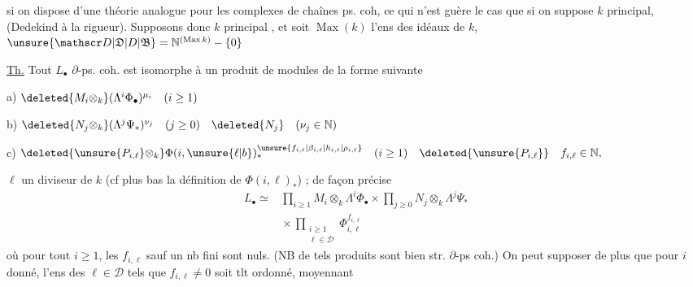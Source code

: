 si on dispose d'une théorie analogue pour les complexes de chaînes  ps. coh, ce qui n'est guère le cas que si on suppose $k$ principal, (Dedekind à la rigueur). Supposons donc $k$  principal  
, et soit $\operatorname{Max}(k)$ l'ens des idéaux   de $k$, $\unsure{\mathscr D|\mathfrak D|D|\mathfrak B}=\mathbb N^{(\operatorname{Max} k)}-\{0\}$

\uline{Th.} Tout $L_\bullet$  $\partial$-ps. coh. est isomorphe à un produit de modules de la forme suivante

a) $\deleted{M_i\otimes_k}(\Lambda^i\Phi_\bullet)^{\mu_i}\quad(i\geq1)$  

b) $\deleted{N_j\otimes_k}(\Lambda^j\Psi_*)^{\nu_j}\quad(j\geq0)\quad\deleted{N_j}\quad(\nu_j\in\mathbb N)$

c) $\deleted{\unsure{P_{i,\ell}}\otimes_k}\Phi(i,\unsure{\ell|b})_*^{\unsure{f_{i,\ell}|\beta_{i,\ell}|h_{i,\ell}|\rho_{i,\ell}}}\quad(i\geq1)\quad\deleted{\unsure{P_{i,\ell}}}\quad f_{i,\ell}\in\mathbb N,$


$\ell$ un  diviseur de $k$ (cf plus bas la définition de $\Phi(i,\ell)_*$) ; de façon précise
\[
\begin{aligned}
L_\bullet\simeq{}&\prod_{i\geq1}M_i\otimes_k\Lambda^i\Phi_\bullet
 \times\prod_{j\geq0}N_j\otimes_k\Lambda^j\Psi_*\\
&{}\times\prod_{\substack{i\geq1\\\ell\in\mathscr D}}\Phi_{i,\ell}^{f_{i,\ell}}
\end{aligned}
\]
où pour tout $i\geq1$,  les $f_{i,\ell}$ sauf un nb fini sont nuls. (NB de tels produits sont bien str. $\partial$-ps coh.) On peut supposer de plus que pour $i$ donné, l'ens des $\ell\in\mathscr D$  tels que $f_{i,\ell}\ne0$ soit tlt ordonné, moyennant
